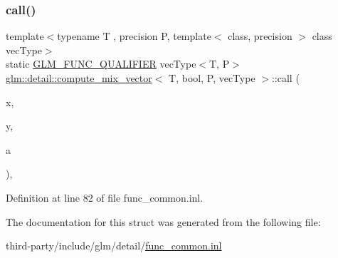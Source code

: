 \subsubsection{\texorpdfstring{call()}{call()}}
{\footnotesize\ttfamily template$<$typename T , precision P, template$<$ class, precision $>$ class vec\+Type$>$ \\
static \hyperlink{setup_8hpp_a33fdea6f91c5f834105f7415e2a64407}{G\+L\+M\+\_\+\+F\+U\+N\+C\+\_\+\+Q\+U\+A\+L\+I\+F\+I\+ER} vec\+Type$<$T, P$>$ \hyperlink{structglm_1_1detail_1_1compute__mix__vector}{glm\+::detail\+::compute\+\_\+mix\+\_\+vector}$<$ T, bool, P, vec\+Type $>$\+::call (\begin{DoxyParamCaption}\item[{vec\+Type$<$ T, P $>$ const \&}]{x,  }\item[{vec\+Type$<$ T, P $>$ const \&}]{y,  }\item[{vec\+Type$<$ bool, P $>$ const \&}]{a }\end{DoxyParamCaption})\hspace{0.3cm}{\ttfamily [inline]}, {\ttfamily [static]}}



Definition at line 82 of file func\+\_\+common.\+inl.



The documentation for this struct was generated from the following file\+:\begin{DoxyCompactItemize}
\item 
third-\/party/include/glm/detail/\hyperlink{func__common_8inl}{func\+\_\+common.\+inl}\end{DoxyCompactItemize}
